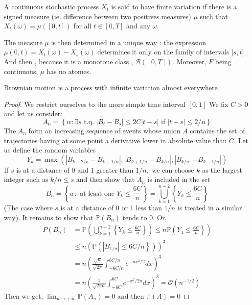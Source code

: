 	\begin{definition}
		A continuous stochastic process $X_t$ is said to have finite variation if there is a signed measure (ie. difference between two positives measures) $\mu$ such that $X_t(\omega)=\mu([0, t])$ for all $t \in[0, T]$ and any $\omega$.
	\end{definition}

	The measure $\mu$ is then determined in a unique way : the expression $\mu(0, t)=X_t(\omega)-X_s(\omega)$ determines it only on the family of intervals $]s, t]$ And then , because it is a monotone class , $\mathcal{B}([0, T]) .$ Moreover, $F$ being continuous, $\mu$ has no atomes.




	\begin{proposition}
Brownian motion is a process with infinite variation almost everywhere
	\end{proposition}
\begin{proof}
	We restrict ourselves to the more simple time interval $[0,1]$
	We fix $C>0$ and let us consider:
	$$
	A_{n}=\left\{w: \exists s \text { t.q. }\left|B_{t}-B_{s}\right| \leq 2 C|t-s| \text { if }|t-s| \leq 2 / n\right\}
	$$
	The $A_ {n}$ form an increasing sequence of events whose union $A$ contains the set of trajectories having at some point a derivative lower in absolute value than $ C. $ Let us define the random variables
	$$
	Y_{k}=\max \left(\left|B_{k+2 / n}-B_{k+1 / n}\right|,\left|B_{k+1 / n}-B_{k / n}\right|,\left|B_{k / n}-B_{k-1 / n}\right|\right)
	$$
If $s$ is at a distance of 0 and 1 greater than $1/n,$ we can choose $k$ as the largest integer such as $k/n \leq s $ and then show that $A_{n}$ is included in the set
	$$
	B_{n}=\left\{w: \text { at least one } Y_{k} \leq \frac{6 C}{n}\right\}=\bigcup_{k=1}^{n-2}\left\{Y_{k} \leq \frac{6 C}{n}\right\}
	$$
	(The case where $ s $ is at a distance of 0 or 1 less than $1/n$ is treated in a similar way).
	It remains to show that $\mathbb{P} \left(B_{n} \right) $ tends to $0.$ Or,
	$$
	\begin{aligned}
	P\left(B_{n}\right) &\left.=\mathbb{P}\left(\bigcup_{k=1}^{n-2}\left\{Y_{k} \leq \frac{6 C}{n}\right\}\right) \leq n \mathbb{P}\left(Y_{1} \leq \frac{6 C}{n}\right\}\right) \\
	&\left.\leq n\left(\mathbb{P}\left(\left|B_{1 / n}\right| \leq 6 C / n\right\}\right)\right)^{3} \\
	&=n\left(\frac{\sqrt{n}}{\sqrt{2 \pi}} \int_{-6 C / n}^{6 C / n} e^{-n x^{2} / 2} d x\right)^{3} \\
	&=n\left(\frac{1}{\sqrt{2 \pi n}} \int_{-6 C}^{6 C} e^{-x^{2} / 2 n} d x\right)^{3}=\mathcal{O}\left(n^{-1 / 2}\right)
	\end{aligned}
	$$
	Then we get, $\lim _{n \rightarrow+\infty} \mathbb{P}\left(A_{n}\right)=0$ and then $\mathbb{P}(A)=0$
\end{proof}

